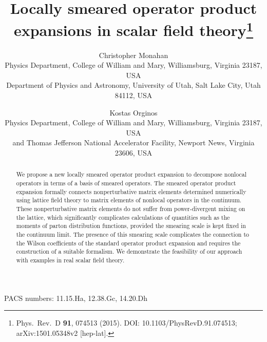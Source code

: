 \documentclass[11pt]{article}
\title{Locally smeared operator product expansions in scalar
field theory\thanks{Phys.\ Rev.\ D \textbf{91}, 074513 (2015).
DOI: 10.1103/PhysRevD.91.074513; arXiv:1501.05348v2 [hep-lat].}}
\author{Christopher Monahan \\[1mm] \small Physics Department, College of William and Mary,
Williamsburg, Virginia 23187, USA \\ \small Department of Physics and Astronomy, University of Utah,
Salt Lake City, Utah 84112, USA
\and Kostas Orginos \\[1mm] \small Physics Department, College of William and Mary,
Williamsburg, Virginia 23187, USA \\ \small and Thomas Jefferson National Accelerator Facility,
Newport News, Virginia 23606, USA}
\date{}
\begin{document}
\maketitle

\begin{abstract}
We propose a new locally smeared operator product expansion to
decompose nonlocal operators in terms of a basis of smeared
operators. The smeared operator product expansion formally connects
nonperturbative matrix elements
determined numerically using lattice field
theory to matrix elements of nonlocal operators in the continuum. These
nonperturbative matrix
elements do not suffer
from power-divergent mixing on the lattice, which significantly
complicates calculations of quantities such as the moments of parton
distribution functions, provided the smearing scale is kept
fixed in the continuum limit. The presence of this smearing scale complicates
the connection to the Wilson coefficients of the standard operator product
expansion and
requires the construction of a suitable formalism. We demonstrate
the feasibility of our approach with examples in real
scalar field theory.
\end{abstract}

\noindent PACS numbers: 11.15.Ha, 12.38.Gc, 14.20.Dh

\bigskip









\end{document}
